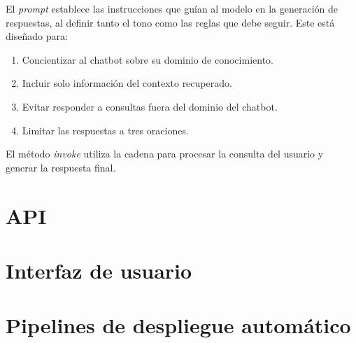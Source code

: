 El \textit{prompt} establece las instrucciones que guían al modelo en la generación de respuestas, al definir 
tanto el tono como las reglas que debe seguir. Este está diseñado para:

\begin{enumerate}
	\item Concientizar al chatbot sobre su dominio de conocimiento.
    \item Incluir solo información del contexto recuperado.
    \item Evitar responder a consultas fuera del dominio del chatbot.
    \item Limitar las respuestas a tres oraciones.
\end{enumerate}

El método \textit{invoke} utiliza la cadena para procesar la consulta del usuario y generar la respuesta final.

\section{API}

\section{Interfaz de usuario}

\section{Pipelines de despliegue automático}